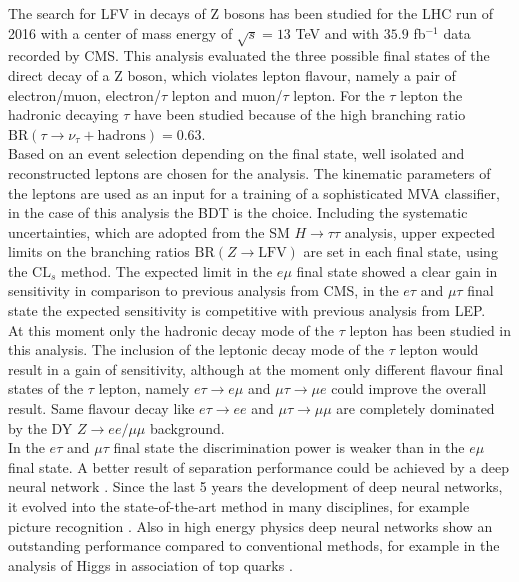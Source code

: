 The search for \gls{LFV} in decays of Z bosons has been studied for the \gls{LHC} run of 2016 with a center of mass energy of $\sqrt{s} = 13$ TeV and with $35.9$ fb$^{-1}$ data recorded by \gls{CMS}. This analysis evaluated the three possible final states of the direct decay of a Z boson, which violates lepton flavour, namely a pair of electron/muon, electron/$\tau$ lepton and muon/$\tau$ lepton. For the $\tau$ lepton the hadronic decaying $\tau$ have been studied because of the high branching ratio $\text{BR}(\tau \to \nu_{\tau} + \text{hadrons}) = 0.63$. \\

Based on an event selection depending on the final state, well isolated and reconstructed leptons are chosen for the analysis. The kinematic parameters of the leptons are used as an input for a training of a sophisticated \gls{MVA} classifier, in the case of this analysis the \gls{BDT} is the choice. Including the systematic uncertainties, which are adopted from the \gls{SM} $H \to \tau\tau$ analysis, upper expected limits on the branching ratios $\text{BR}(Z \to \text{LFV})$ are set in each final state, using the $\text{CL}_{s}$ method. The expected limit in the $e\mu$ final state showed a clear gain in sensitivity in comparison to previous analysis from \gls{CMS}, in the $e\tau$ and $\mu\tau$ final state the expected sensitivity is competitive with previous analysis from \gls{LEP}. \\

At this moment only the hadronic decay mode of the $\tau$ lepton has been studied in this analysis. The inclusion of the leptonic decay mode of the $\tau$ lepton would result in a gain of sensitivity, although at the moment only different flavour final states of the $\tau$ lepton, namely $e\tau \to e\mu$ and $\mu\tau \to \mu e$ could improve the overall result. Same flavour decay like $e\tau \to ee$ and $\mu\tau \to \mu\mu$ are completely dominated by the \gls{DY} $Z\to ee/\mu\mu$ background. \\

In the $e\tau$ and $\mu\tau$ final state the discrimination power is weaker than in the $e\mu$ final state. A better result of separation performance could be achieved by a deep neural network \cite{DNN}. Since the last 5 years the development of deep neural networks, it evolved into the state-of-the-art method in many disciplines, for example picture recognition \cite{DNN2}. Also in high energy physics deep neural networks show an outstanding performance compared to conventional methods, for example in the analysis of Higgs in association of top quarks \cite{DNN3}. \\

